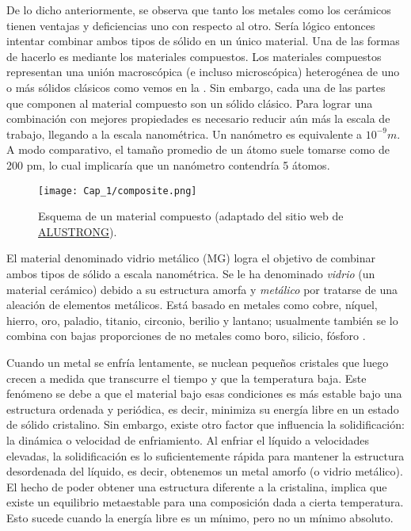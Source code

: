 De lo dicho anteriormente, se observa que tanto los metales como los cerámicos tienen ventajas y deficiencias uno con respecto al otro. Sería lógico entonces intentar combinar ambos tipos de sólido en un único material. Una de las formas de hacerlo es mediante los materiales compuestos. Los materiales compuestos representan una unión macroscópica (e incluso microscópica) heterogénea de uno o más sólidos clásicos como vemos en la . Sin embargo, cada una de las partes que componen al material compuesto son un sólido clásico. Para lograr una combinación con mejores propiedades es necesario reducir aún más la escala de trabajo, llegando a la escala nanométrica. Un nanómetro es equivalente a $10^{-9} m$. A modo comparativo, el tamaño promedio de un átomo suele tomarse como de 200 pm, lo cual implicaría que un nanómetro contendría 5 átomos.

\begin{figure}[h!]
 \centering
 \texttt{[image: Cap\_1/composite.png]}
 \caption[Esquema de un material compuesto]{Esquema de un material compuesto (adaptado del sitio web de \href{http://www.alustrong.com}{ALUSTRONG}).}
 \label{C1:fg:composite}
\end{figure}

El material denominado vidrio metálico (MG) logra el objetivo de combinar ambos tipos de sólido a escala nanométrica. Se le ha denominado \textit{vidrio} (un material cerámico) debido a su estructura amorfa y \textit{metálico} por tratarse de una aleación de elementos metálicos. Está basado en metales como cobre, níquel, hierro, oro, paladio, titanio, circonio, berilio y lantano; usualmente también se lo combina con bajas proporciones de no metales como boro, silicio, fósforo \citep{andrievski13}.

 Cuando un metal se enfría lentamente, se nuclean pequeños cristales que luego crecen a medida que transcurre el tiempo y que la temperatura baja. Este fenómeno se debe a que el material bajo esas condiciones es más estable bajo una estructura ordenada y periódica, es decir, minimiza su energía libre en un estado de sólido cristalino. Sin embargo, existe otro factor que influencia la solidificación: la dinámica o velocidad de enfriamiento. Al enfriar el líquido a velocidades elevadas, la solidificación es lo suficientemente rápida para mantener la estructura desordenada del líquido, es decir, obtenemos un metal amorfo (o vidrio metálico). El hecho de poder obtener una estructura diferente a la cristalina, implica que existe un equilibrio metaestable para una composición dada a cierta temperatura. Esto sucede cuando la energía libre es un mínimo, pero no un mínimo absoluto.

